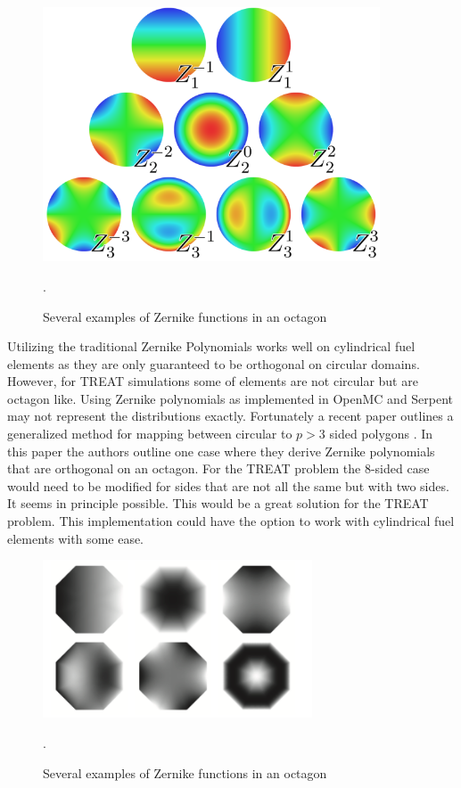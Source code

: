 \documentclass[11pt]{article}
\begin{document}
\begin{figure}
    \centering
    \includegraphics[width=10cm]{figures/zernike-circle.png}
    \caption{Several examples of Zernike functions in an octagon \cite{ferreira2015orthogonal}}.
    \label{fig:zernike}
\end{figure}

Utilizing the traditional Zernike Polynomials works well on cylindrical fuel elements as they are only guaranteed to be orthogonal on circular domains.  However, for  TREAT simulations some of elements are not circular but are octagon like.  Using Zernike polynomials as implemented in OpenMC and Serpent may not represent the distributions exactly.  Fortunately a recent paper outlines a generalized method for mapping between circular to $p >3$ sided polygons \cite{ferreira2015orthogonal}.  In this paper the authors outline one case where they derive Zernike polynomials that are orthogonal on an octagon. For the TREAT problem the 8-sided case would need to be modified for sides that are not all the same but with two sides.  It seems in principle possible.  This would be a great solution for the TREAT problem. This implementation could have the option to work with cylindrical fuel elements with some ease.   

\begin{figure}
    \centering
    \includegraphics[width=8cm]{figures/octogon-FET.png}
    \caption{Several examples of Zernike functions in an octagon \cite{ferreira2015orthogonal}}.
    \label{fig:oct-fet}
\end{figure}
\end{document}
